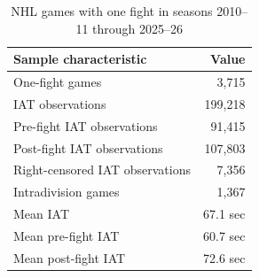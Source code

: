 \begin{table}[htbp]
\centering
\caption{NHL games with one fight in seasons 2010--11 through 2025--26}
\label{tab:one_fight_sample_20102011_20252026}
\scriptsize
\renewcommand{\arraystretch}{1.12}
\setlength{\tabcolsep}{5pt}

\begin{tabular*}{0.78\textwidth}{@{\extracolsep{\fill}}lr}
\toprule
Sample characteristic & Value \\
\midrule
One-fight games & 3,715 \\
IAT observations & 199,218 \\
Pre-fight IAT observations & 91,415 \\
Post-fight IAT observations & 107,803 \\
Right-censored IAT observations & 7,356 \\
Intradivision games & 1,367 \\
Mean IAT & 67.1 sec \\
Mean pre-fight IAT & 60.7 sec \\
Mean post-fight IAT & 72.6 sec \\
\bottomrule
\end{tabular*}
\end{table}
